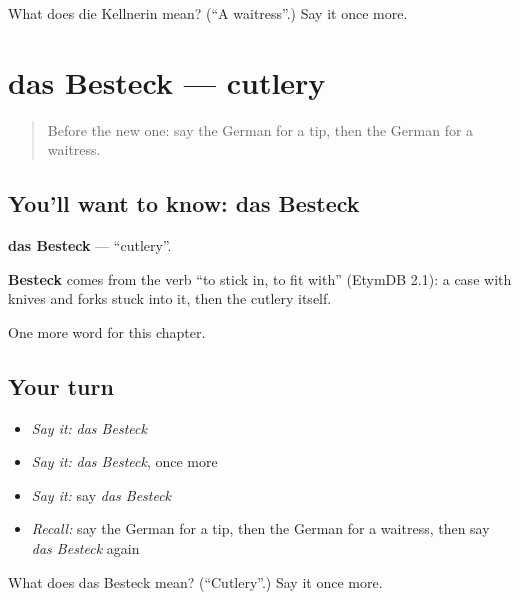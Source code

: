 \begin{tcolorbox}[breakable,colback=teal!4,colframe=teal!35!black,title={Before you move on}]
What does die Kellnerin mean? (\textquotedblleft{}A waitress\textquotedblright{}.) Say it once more.
\end{tcolorbox}
\section[das Besteck]{das Besteck — cutlery}

\label{lesson:GE-C200-besteck}



\begin{quote}
Before the new one: say the German for a tip, then the German for a waitress.
\end{quote}

\subsection*{You'll want to know: das Besteck}
\textbf{das Besteck} — \textquotedblleft{}cutlery\textquotedblright{}.

\begin{cousinweb}
\textbf{Besteck} comes from the verb \textquotedblleft{}to stick in, to fit with\textquotedblright{} (EtymDB 2.1): a case with knives and forks stuck into it, then the cutlery itself.
\end{cousinweb}

\begin{grammarlens}[title={What you've built}]
One more word for this chapter.
\end{grammarlens}

\subsection*{Your turn}
\begin{itemize}
\raggedright
  \item \emph{Say it:} \emph{das Besteck}
  \item \emph{Say it:} \emph{das Besteck}, once more
  \item \emph{Say it:} say \emph{das Besteck}
  \item \emph{Recall:} say the German for a tip, then the German for a waitress, then say \emph{das Besteck} again
\end{itemize}

\begin{tcolorbox}[breakable,colback=teal!4,colframe=teal!35!black,title={Before you move on}]
What does das Besteck mean? (\textquotedblleft{}Cutlery\textquotedblright{}.) Say it once more.
\end{tcolorbox}
